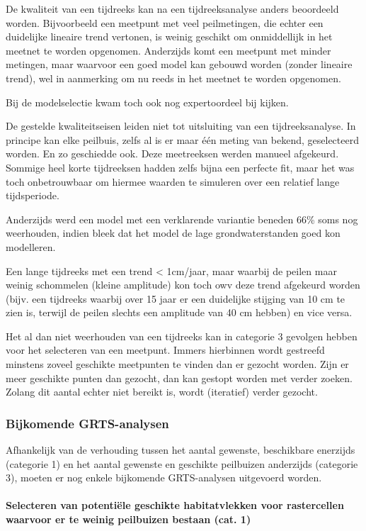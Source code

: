 \documentclass[11pt,]{book}
\let\oldparagraph\paragraph
\renewcommand{\paragraph}[1]{\oldparagraph{#1}\mbox{}}
\begin{document}
De kwaliteit van een tijdreeks kan na een tijdreeksanalyse anders
beoordeeld worden. Bijvoorbeeld een meetpunt met veel peilmetingen, die
echter een duidelijke lineaire trend vertonen, is weinig geschikt om
onmiddellijk in het meetnet te worden opgenomen. Anderzijds komt een
meetpunt met minder metingen, maar waarvoor een goed model kan gebouwd
worden (zonder lineaire trend), wel in aanmerking om nu reeds in het
meetnet te worden opgenomen.

Bij de modelselectie kwam toch ook nog expertoordeel bij kijken.

De gestelde kwaliteitseisen leiden niet tot uitsluiting van een
tijdreeksanalyse. In principe kan elke peilbuis, zelfs al is er maar één
meting van bekend, geselecteerd worden. En zo geschiedde ook. Deze
meetreeksen werden manueel afgekeurd. Sommige heel korte tijdreeksen
hadden zelfs bijna een perfecte fit, maar het was toch onbetrouwbaar om
hiermee waarden te simuleren over een relatief lange tijdsperiode.

Anderzijds werd een model met een verklarende variantie beneden 66\%
soms nog weerhouden, indien bleek dat het model de lage
grondwaterstanden goed kon modelleren.

Een lange tijdreeks met een trend \textless{} 1cm/jaar, maar waarbij de
peilen maar weinig schommelen (kleine amplitude) kon toch owv deze trend
afgekeurd worden (bijv. een tijdreeks waarbij over 15 jaar er een
duidelijke stijging van 10 cm te zien is, terwijl de peilen slechts een
amplitude van 40 cm hebben) en vice versa.

Het al dan niet weerhouden van een tijdreeks kan in categorie 3 gevolgen
hebben voor het selecteren van een meetpunt. Immers hierbinnen wordt
gestreefd minstens zoveel geschikte meetpunten te vinden dan er gezocht
worden. Zijn er meer geschikte punten dan gezocht, dan kan gestopt
worden met verder zoeken. Zolang dit aantal echter niet bereikt is,
wordt (iteratief) verder gezocht.

\subsubsection{Bijkomende GRTS-analysen}\label{bijkomende-grts-analysen}

Afhankelijk van de verhouding tussen het aantal gewenste, beschikbare
enerzijds (categorie 1) en het aantal gewenste en geschikte peilbuizen
anderzijds (categorie 3), moeten er nog enkele bijkomende GRTS-analysen
uitgevoerd worden.

\paragraph{Selecteren van potentiële geschikte habitatvlekken voor
rastercellen waarvoor er te weinig peilbuizen bestaan (cat.
1)}\label{sel-pot-habvlek}
\end{document}
